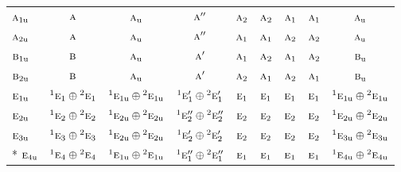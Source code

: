 \documentclass[10pt,a4paper]{article}
\numberwithin{equation}{section}
\newcommand{\irr}[1]{\text{\normalfont\scshape #1}}
\newcommand{\conjpair}[1]{{}^{#1}}
\newcommand{\ptag}[1]{\mathrm{#1}}
\begin{document}
{\begin{longtable}{@{}lcccccccc@{}}
$\irr{a}_{1\ptag{u}}$ & $\irr{a}$ & $\irr{a}_{\ptag{u}}$ & $\irr{a}''$ & $\irr{a}_{2}$ & $\irr{a}_{2}$ & $\irr{a}_{1}$ & $\irr{a}_{1}$ & $\irr{a}_{\ptag{u}}$\\
$\irr{a}_{2\ptag{u}}$ & $\irr{a}$ & $\irr{a}_{\ptag{u}}$ & $\irr{a}''$ & $\irr{a}_{1}$ & $\irr{a}_{1}$ & $\irr{a}_{2}$ & $\irr{a}_{2}$ & $\irr{a}_{\ptag{u}}$\\
$\irr{b}_{1\ptag{u}}$ & $\irr{b}$ & $\irr{a}_{\ptag{u}}$ & $\irr{a}'$ & $\irr{a}_{1}$ & $\irr{a}_{2}$ & $\irr{a}_{1}$ & $\irr{a}_{2}$ & $\irr{b}_{\ptag{u}}$\\
$\irr{b}_{2\ptag{u}}$ & $\irr{b}$ & $\irr{a}_{\ptag{u}}$ & $\irr{a}'$ & $\irr{a}_{2}$ & $\irr{a}_{1}$ & $\irr{a}_{2}$ & $\irr{a}_{1}$ & $\irr{b}_{\ptag{u}}$\\
$\irr{e}_{1\ptag{u}}$ & $\conjpair{1}\irr{e}_{1}\oplus \conjpair{2}\irr{e}_{1}$ & $\conjpair{1}\irr{e}_{1\ptag{u}}\oplus \conjpair{2}\irr{e}_{1\ptag{u}}$ & $\conjpair{1}\irr{e}_{1}'\oplus \conjpair{2}\irr{e}_{1}'$ & $\irr{e}_{1}$ & $\irr{e}_{1}$ & $\irr{e}_{1}$ & $\irr{e}_{1}$ & $\conjpair{1}\irr{e}_{1\ptag{u}}\oplus \conjpair{2}\irr{e}_{1\ptag{u}}$\\
$\irr{e}_{2\ptag{u}}$ & $\conjpair{1}\irr{e}_{2}\oplus \conjpair{2}\irr{e}_{2}$ & $\conjpair{1}\irr{e}_{2\ptag{u}}\oplus \conjpair{2}\irr{e}_{2\ptag{u}}$ & $\conjpair{1}\irr{e}_{2}''\oplus \conjpair{2}\irr{e}_{2}''$ & $\irr{e}_{2}$ & $\irr{e}_{2}$ & $\irr{e}_{2}$ & $\irr{e}_{2}$ & $\conjpair{1}\irr{e}_{2\ptag{u}}\oplus \conjpair{2}\irr{e}_{2\ptag{u}}$\\
$\irr{e}_{3\ptag{u}}$ & $\conjpair{1}\irr{e}_{3}\oplus \conjpair{2}\irr{e}_{3}$ & $\conjpair{1}\irr{e}_{2\ptag{u}}\oplus \conjpair{2}\irr{e}_{2\ptag{u}}$ & $\conjpair{1}\irr{e}_{2}'\oplus \conjpair{2}\irr{e}_{2}'$ & $\irr{e}_{2}$ & $\irr{e}_{2}$ & $\irr{e}_{2}$ & $\irr{e}_{2}$ & $\conjpair{1}\irr{e}_{3\ptag{u}}\oplus \conjpair{2}\irr{e}_{3\ptag{u}}$\\*
$\irr{e}_{4\ptag{u}}$ & $\conjpair{1}\irr{e}_{4}\oplus \conjpair{2}\irr{e}_{4}$ & $\conjpair{1}\irr{e}_{1\ptag{u}}\oplus \conjpair{2}\irr{e}_{1\ptag{u}}$ & $\conjpair{1}\irr{e}_{1}''\oplus \conjpair{2}\irr{e}_{1}''$ & $\irr{e}_{1}$ & $\irr{e}_{1}$ & $\irr{e}_{1}$ & $\irr{e}_{1}$ & $\conjpair{1}\irr{e}_{4\ptag{u}}\oplus \conjpair{2}\irr{e}_{4\ptag{u}}$\\
\bottomrule\end{longtable}}
\end{document}
